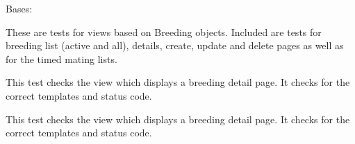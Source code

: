 \documentclass[letterpaper,10pt,english]{sphinxmanual}
\begin{document}
\begin{fulllineitems}
\label{api:mousedb.animal.tests.BreedingViewTests}
Bases: 

These are tests for views based on Breeding objects.  Included are tests for breeding list (active and all), details, create, update and delete pages as well as for the timed mating lists.

\begin{fulllineitems}
\label{api:mousedb.animal.tests.BreedingViewTests.fixtures}
\end{fulllineitems}


\begin{fulllineitems}
\label{api:mousedb.animal.tests.BreedingViewTests.setUp}
\end{fulllineitems}


\begin{fulllineitems}
\label{api:mousedb.animal.tests.BreedingViewTests.tearDown}
\end{fulllineitems}


\begin{fulllineitems}
\label{api:mousedb.animal.tests.BreedingViewTests.test_breeding_delete}
This test checks the view which displays a breeding detail page.  It checks for the correct templates and status code.

\end{fulllineitems}


\begin{fulllineitems}
\label{api:mousedb.animal.tests.BreedingViewTests.test_breeding_detail}
This test checks the view which displays a breeding detail page.  It checks for the correct templates and status code.


\end{fulllineitems}
\end{fulllineitems}
\end{document}

